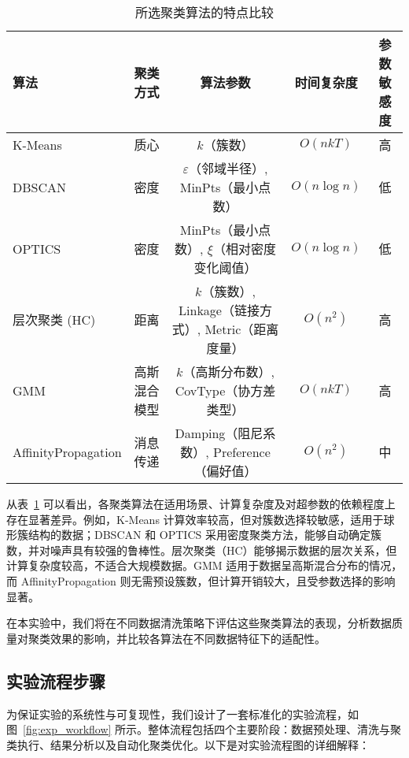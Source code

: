 \documentclass[10pt]{article} %
\numberwithin{equation}{section}
\begin{document}
\begin{table}[htbp]
    \centering
    \small %
    \begin{tabular}{lcccc}
        \toprule
        \textbf{算法} & \textbf{聚类方式} & \textbf{算法参数} & \textbf{时间复杂度} & \textbf{参数敏感度} \\
        \midrule
        K-Means & 质心 & $k$（簇数） & $O(nkT)$ & 高 \\
        DBSCAN & 密度 & $\varepsilon$（邻域半径）, MinPts（最小点数） & $O(n \log n)$ & 低 \\
        OPTICS & 密度 & MinPts（最小点数）, $\xi$（相对密度变化阈值） & $O(n \log n)$ & 低 \\
        层次聚类 (HC) & 距离 & $k$（簇数）, Linkage（链接方式）, Metric（距离度量） & $O(n^2)$ & 高 \\
        GMM & 高斯混合模型 & $k$（高斯分布数）, CovType（协方差类型） & $O(nkT)$ & 高 \\
        AffinityPropagation & 消息传递 & Damping（阻尼系数）, Preference（偏好值） & $O(n^2)$ & 中 \\
        \bottomrule
    \end{tabular}
    \caption{所选聚类算法的特点比较}
    \label{tab:clustering_algorithms}
\end{table}

\noindent
从表~\ref{tab:clustering_algorithms} 可以看出，各聚类算法在适用场景、计算复杂度及对超参数的依赖程度上存在显著差异。例如，K-Means 计算效率较高，但对簇数选择较敏感，适用于球形簇结构的数据；DBSCAN 和 OPTICS 采用密度聚类方法，能够自动确定簇数，并对噪声具有较强的鲁棒性。层次聚类（HC）能够揭示数据的层次关系，但计算复杂度较高，不适合大规模数据。GMM 适用于数据呈高斯混合分布的情况，而 AffinityPropagation 则无需预设簇数，但计算开销较大，且受参数选择的影响显著。

在本实验中，我们将在不同数据清洗策略下评估这些聚类算法的表现，分析数据质量对聚类效果的影响，并比较各算法在不同数据特征下的适配性。

\vspace{1em}
\subsection{实验流程步骤}
\label{sec:exp_flow}

为保证实验的系统性与可复现性，我们设计了一套标准化的实验流程，如图~\ref{fig:exp_workflow} 所示。整体流程包括四个主要阶段：数据预处理、清洗与聚类执行、结果分析以及自动化聚类优化。以下是对实验流程图的详细解释：
\end{document}
